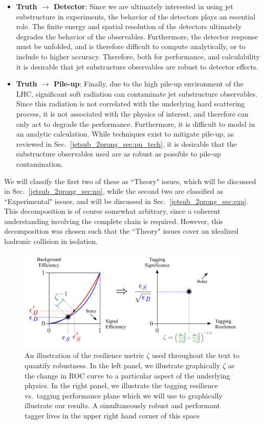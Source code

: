 \documentclass[11pt]{cernrep}
\begin{document}
\begin{itemize}
%
\item {\bf Truth $\to$ Detector}: Since we are ultimately interested in using jet substructure in experiments, the behavior of the detectors plays an essential role.
%
The finite energy and spatial resolution of the detectors ultimately degrades the behavior of the observables.
%
Furthermore, the detector response must be unfolded, and is therefore difficult to compute analytically, or to include to higher accuracy. Therefore, both for performance, and calculability it is desirable that jet substructure observables are robust to detector effects.
%
\item {\bf Truth $\to$ Pile-up}: Finally, due to the high pile-up environment of the LHC, significant soft radiation can contaminate jet substructure observables.
%
Since this radiation is not correlated with the underlying hard scattering process, it is not associated with the physics of interest, and therefore can only act to degrade the performance.
%
Furthermore, it is difficult to model in an analytic calculation.
%
While techniques exist to mitigate pile-up, as reviewed in Sec.~\ref{jetsub_2prong_sec:pu_tech}, it is desirable that the substructure observables used are as robust as possible to pile-up contamination.
%
\end{itemize}
%
We will classify the first two of these as ``Theory" issues, which will be discussed in Sec.~\ref{jetsub_2prong_sec:np}, while the second two are classified as ``Experimental" issues, and will be discussed in Sec.~\ref{jetsub_2prong_sec:exp}. This decomposition is of course somewhat arbitrary, since a coherent understanding involving the complete chain is required. However, this decomposition was chosen such that the ``Theory" issues cover an idealized hadronic collision in isolation. 

\begin{figure}[t]
\begin{center}
\includegraphics[width=0.9\columnwidth]{jetsub_2prong_roc_to_significance}
\end{center}
\caption{An illustration of the resilience metric $\zeta$ used throughout the text to quantify robustness. In the left panel, we illustrate graphically $\zeta$ as the change in ROC curve to a particular aspect of the underlying physics. In the right panel, we illustrate the tagging resilience vs.\ tagging performance plane which we will use to graphically illustrate our results.  A simultaneously robust and performant tagger lives in the upper right hand corner of this space}
\label{jetsub_2prong_fig:zeta_def}
\end{figure}
\end{document}
